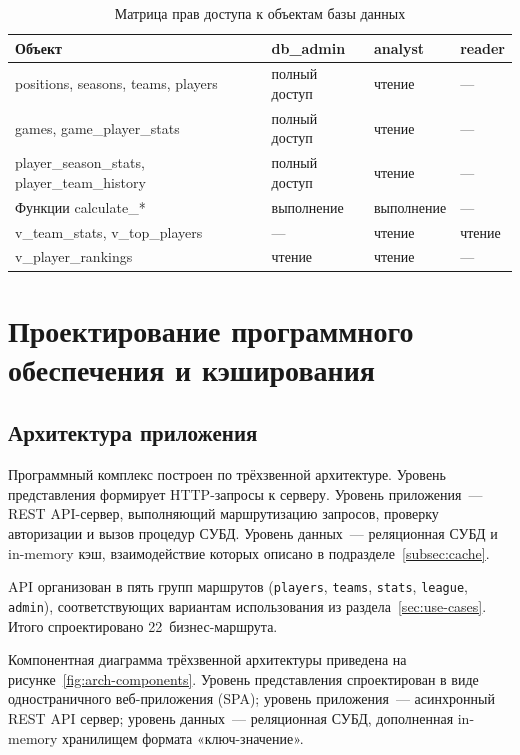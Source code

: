 \begin{table}[H]
\caption{Матрица прав доступа к объектам базы данных}
\label{tab:acl-matrix}
\centering
\begin{tabular}{|p{}|p{}|p{}|p{}|}
\hline
\textbf{Объект} & \textbf{db\_admin} & \textbf{analyst} & \textbf{reader} \\
\hline
positions, seasons, teams, players & полный доступ & чтение & --- \\
\hline
games, game\_player\_stats & полный доступ & чтение & --- \\
\hline
player\_season\_stats, player\_team\_history & полный доступ & чтение & --- \\
\hline
Функции calculate\_* & выполнение & выполнение & --- \\
\hline
v\_team\_stats, v\_top\_players & --- & чтение & чтение \\
\hline
v\_player\_rankings & чтение & чтение & --- \\
\hline
\end{tabular}
\end{table}

\section{Проектирование программного обеспечения и кэширования}

\subsection{Архитектура приложения}\label{subsec:app-architecture}

Программный комплекс построен по трёхзвенной архитектуре. Уровень представления
формирует HTTP-запросы к серверу. Уровень приложения~--- REST
API-сервер, выполняющий маршрутизацию запросов, проверку авторизации и вызов
процедур СУБД. Уровень данных~--- реляционная СУБД и in-memory кэш,
взаимодействие которых описано в подразделе~\ref{subsec:cache}.

API организован в пять групп маршрутов (\texttt{players}, \texttt{teams},
\texttt{stats}, \texttt{league}, \texttt{admin}), соответствующих вариантам
использования из раздела~\ref{sec:use-cases}. Итого спроектировано 22~бизнес-маршрута.

Компонентная диаграмма трёхзвенной архитектуры приведена на
рисунке~\ref{fig:arch-components}. Уровень представления спроектирован
в виде одностраничного веб-приложения (SPA); уровень приложения~---
асинхронный REST API сервер; уровень данных~--- реляционная СУБД,
дополненная in-memory хранилищем формата «ключ-значение».


